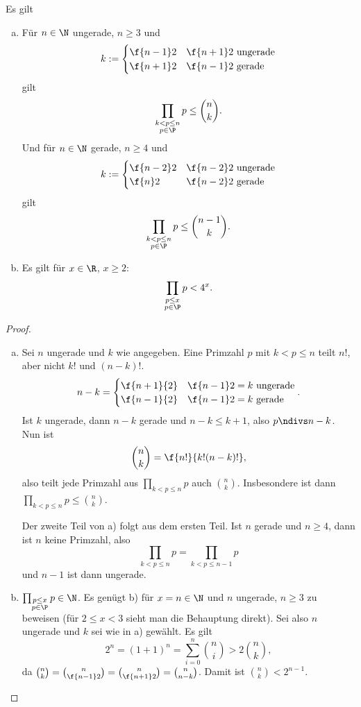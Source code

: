 \begin{lem} \label{7.8}
	Es gilt
	\begin{enumerate}[a)]
		\item
			Für $n \in \N$ ungerade, $n \ge 3$ und
			\begin{align*}
				k := \begin{cases}
					\f {n-1}2 & \f{n+1}2 \text{ ungerade} \\
					\f {n+1}2 & \f{n-1}2 \text{ gerade}
				\end{cases}
			\end{align*}
			gilt
			\[
				\prod_{\substack{k < p \le n \\ p \in \P}} p \le \binom{n}{k}.
			\]
			Und für $n \in \N$ gerade, $n \ge 4$ und
			\begin{align*}
				k := \begin{cases}
					\f {n-2}2 & \f{n-2}2 \text{ ungerade} \\
					\f{n}2 & \f{n-2}2 \text{ gerade}
				\end{cases}
			\end{align*}
			gilt
			\[
				\prod_{\substack{k < p \le n \\ p \in \P}} p \le \binom{n-1}{k}.
			\]
		\item
			Es gilt für $x \in \R$, $x \ge 2$:
			\[
				\prod_{\substack{p \le x \\ p \in \P}} p < 4^x.
			\]
	\end{enumerate}
	\begin{proof}
		\begin{enumerate}[a)]
			\item
				Sei $n$ ungerade und $k$ wie angegeben.
				Eine Primzahl $p$ mit $k < p \le n$ teilt $n!$, aber nicht $k!$ und $(n-k)!$.
				\[
					n-k = \begin{cases}
						\f{n+1}{2} & \f{n-1}2 = k \text{ ungerade} \\
						\f{n-1}{2} & \f{n-1}2 = k \text{ gerade}
					\end{cases}.
				\]
				Ist $k$ ungerade, dann $n-k$ gerade und $n - k \le k + 1$, also $p \ndivs n - k$.
				Nun ist
				\[
					\binom{n}{k} = \f {n!}{k!(n-k)!},
				\]
				also teilt jede Primzahl aus $\prod_{k < p \le n} p$ auch $\binom{n}{k}$.
				Insbesondere ist dann $\prod_{k < p \le n} p \le \binom{n}{k}$.

				Der zweite Teil von a) folgt aus dem ersten Teil.
				Ist $n$ gerade und $n \ge 4$, dann ist $n$ keine Primzahl, also
				\[
					\prod_{k < p \le n} p
					= \prod_{k < p \le n-1} p
				\]
				und $n-1$ ist dann ungerade.
			\item
				$\prod_{\substack{p \le x\\ p\in \P}} p \in \N$.
				Es genügt b) für $x = n \in \N$ und $n$ ungerade, $n \ge 3$ zu beweisen (für $2 \le x < 3$ sieht man die Behauptung direkt).
				Sei also $n$ ungerade und $k$ sei wie in a) gewählt.
				Es gilt
				\[
					2^n = (1+1)^n
					= \sum_{i=0}^n \binom{n}{i}
					> 2 \binom{n}{k},
				\]
				da $\binom{n}{k} = \binom{n}{\f{n-1}2} = \binom{n}{\f{n+1}2} = \binom{n}{n-k}$.
				Damit ist $\binom{n}{k} < 2^{n-1}$.


\end{enumerate}
\end{proof}
\end{lem}
